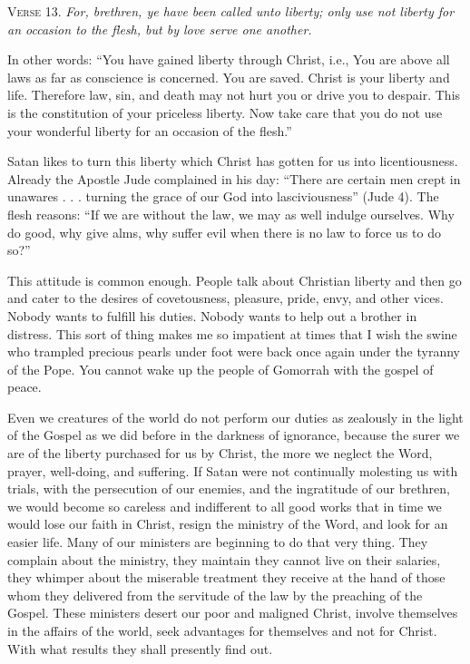 \textsc{Verse} 13. \emph{For, brethren, ye have been called unto liberty; only use not liberty for an occasion to the flesh, but by love serve one another.}

In other words: “You have gained liberty through Christ, i.e., You are above all laws as far as conscience is concerned. You are saved. Christ is your liberty and life. Therefore law, sin, and death may not hurt you or drive you to despair. This is the constitution of your priceless liberty. Now take care that you do not use your wonderful liberty for an occasion of the flesh.”

Satan likes to turn this liberty which Christ has gotten for us into licentiousness. Already the Apostle Jude complained in his day: “There are certain men crept in unawares . . . turning the grace of our God into lasciviousness” (Jude 4). The flesh reasons: “If we are without the law, we may as well indulge ourselves. Why do good, why give alms, why suffer evil when there is no law to force us to do so?”

This attitude is common enough. People talk about Christian liberty and then go and cater to the desires of covetousness, pleasure, pride, envy, and other vices. Nobody wants to fulfill his duties. Nobody wants to help out a brother in distress. This sort of thing makes me so impatient at times that I wish the swine who trampled precious pearls under foot were back once again under the tyranny of the Pope. You cannot wake up the people of Gomorrah with the gospel of peace.

Even we creatures of the world do not perform our duties as zealously in the light of the Gospel as we did before in the darkness of ignorance, because the surer we are of the liberty purchased for us by Christ, the more we neglect the Word, prayer, well-doing, and suffering. If Satan were not continually molesting us with trials, with the persecution of our enemies, and the ingratitude of our brethren, we would become so careless and indifferent to all good works that in time we would lose our faith in Christ, resign the ministry of the Word, and look for an easier life. Many of our ministers are beginning to do that very thing. They complain about the ministry, they maintain they cannot live on their salaries, they whimper about the miserable treatment they receive at the hand of those whom they delivered from the servitude of the law by the preaching of the Gospel. These ministers desert our poor and maligned Christ, involve themselves in the affairs of the world, seek advantages for themselves and not for Christ. With what results they shall presently find out.

